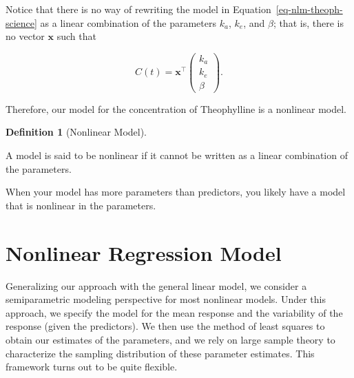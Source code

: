 \documentclass[
  letterpaper,
  DIV=11,
  numbers=noendperiod]{scrreprt}
\theoremstyle{definition}
\newtheorem{definition}{Definition}[chapter]
\theoremstyle{definition}
\theoremstyle{remark}
\begin{document}
Notice that there is no way of rewriting the model in
Equation~\ref{eq-nlm-theoph-science} as a linear combination of the
parameters \(k_a\), \(k_e\), and \(\beta\); that is, there is no vector
\(\mathbf{x}\) such that

\[C(t) = \mathbf{x}^\top \begin{pmatrix} k_a \\ k_e \\ \beta \end{pmatrix}.\]

Therefore, our model for the concentration of Theophylline is a
nonlinear model.

\begin{definition}[Nonlinear
Model]\protect\hypertarget{def-nlm}{}\label{def-nlm}

A model is said to be nonlinear if it cannot be written as a linear
combination of the parameters.

\end{definition}

\begin{tcolorbox}[enhanced jigsaw, left=2mm, toprule=.15mm, arc=.35mm, breakable, opacitybacktitle=0.6, opacityback=0, rightrule=.15mm, colbacktitle=quarto-callout-note-color!10!white, coltitle=black, leftrule=.75mm, toptitle=1mm, colframe=quarto-callout-note-color-frame, titlerule=0mm, title=\textcolor{quarto-callout-note-color}{\faInfo}\hspace{0.5em}{Note}, bottomrule=.15mm, colback=white, bottomtitle=1mm]

When your model has more parameters than predictors, you likely have a
model that is nonlinear in the parameters.

\end{tcolorbox}

\hypertarget{nonlinear-regression-model}{%
\section{Nonlinear Regression Model}\label{nonlinear-regression-model}}

Generalizing our approach with the general linear model, we consider a
semiparametric modeling perspective for most nonlinear models. Under
this approach, we specify the model for the mean response and the
variability of the response (given the predictors). We then use the
method of least squares to obtain our estimates of the parameters, and
we rely on large sample theory to characterize the sampling distribution
of these parameter estimates. This framework turns out to be quite
flexible.
\end{document}
